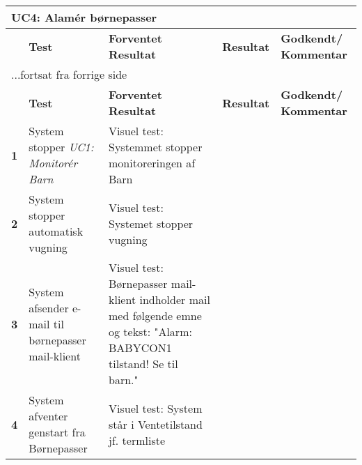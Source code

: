 \begin{center}
	\label{accepttest:uc4} 
\begin{longtable}{|p{}|p{}|p{}|p{}|p{}|} %
\hline
\multicolumn{5}{|l|}{\textbf{UC4: Alamér børnepasser}} \\ \hline
\multicolumn{1}{|c|}{} &
\textbf{Test} &
\textbf{Forventet \newline Resultat} &
\textbf{Resultat} &
\textbf{Godkendt/ \newline Kommentar} \\ \hline 
\endfirsthead

\multicolumn{5}{l}{...fortsat fra forrige side} \\ \hline 
\multicolumn{1}{|c|}{} &
\textbf{Test} &
\textbf{Forventet \newline Resultat} &
\textbf{Resultat} &
\textbf{Godkendt/ \newline Kommentar} \\ \hline 
\endhead



\textbf{1}	&System stopper \textit{UC1: Monitorér Barn}
			&Visuel test: Systemmet stopper monitoreringen af Barn
			&
			&
			\\\hline

\textbf{2}	&System stopper automatisk vugning
			&Visuel test: Systemet stopper vugning
			&
			&
			\\\hline
			 
\textbf{3}	&System afsender e-mail til børnepasser mail-klient
			&Visuel test: Børnepasser mail-klient indholder mail med følgende emne og tekst: "Alarm: BABYCON1 tilstand! Se til barn." 
			&
			&
			\\\hline

\textbf{4}	&System afventer genstart fra Børnepasser
			&Visuel test: System står i Ventetilstand jf. termliste
			&
			&
			\\\hline

\end{longtable}
\end{center}